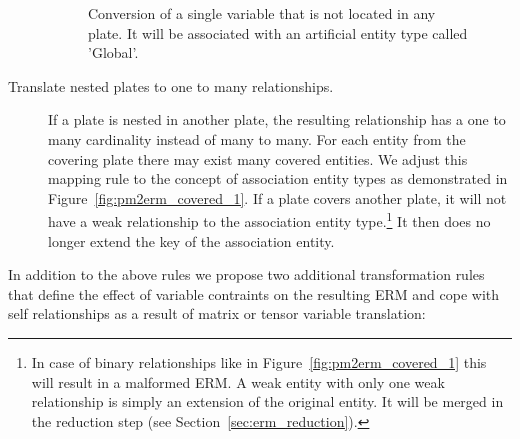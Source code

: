 \begin{description}
\begin{figure}[p]
\centering
\scalebox{\tikzScale}{\adjustTikzSize }
\caption{Conversion of a single variable that is not located in any plate. It will be associated with an artificial entity type called 'Global'.}\label{fig:pm2erm_uno_global}
\end{figure}

\item[Translate nested plates to one to many relationships.] If a plate is nested in another plate, the resulting relationship has a one to many cardinality instead of many to many. For each entity from the covering plate there may exist many covered entities. We adjust this mapping rule to the concept of association entity types as demonstrated in Figure~\ref{fig:pm2erm_covered_1}. If a plate covers another plate, it will not have a weak relationship to the association entity type.\footnote{In case of binary relationships like in Figure~\ref{fig:pm2erm_covered_1} this will result in a malformed ERM. A weak entity with only one weak relationship is simply an extension of the original entity. It will be merged in the reduction step (see Section~\ref{sec:erm_reduction}).} It then does no longer extend the key of the association entity.
\end{description}

In addition to the above rules we propose two additional transformation rules that define the effect of variable contraints on the resulting ERM and cope with self relationships as a result of matrix or tensor variable translation:

